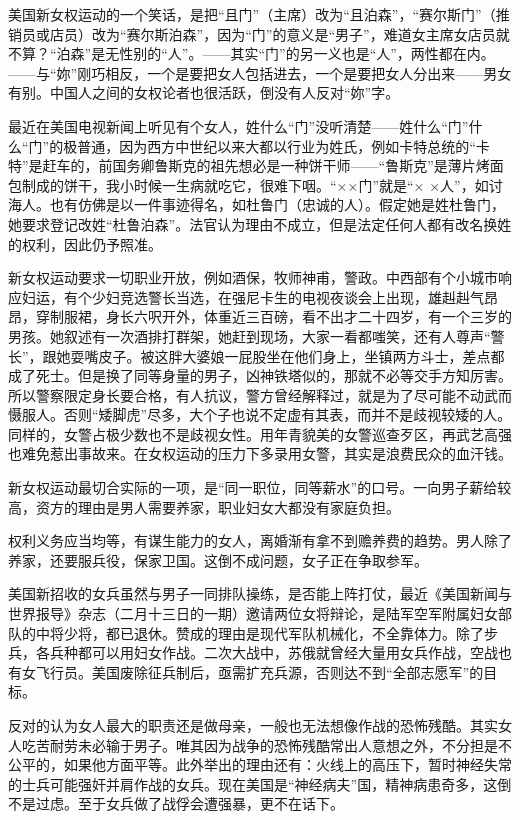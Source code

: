 \par 美国新女权运动的一个笑话，是把“且门”（主席）改为“且泊森”，“赛尔斯门”（推销员或店员）改为“赛尔斯泊森”，因为“门”的意义是“男子”，难道女主席女店员就不算？“泊森”是无性别的“人”。——其实“门”的另一义也是“人”，两性都在内。——与“妳”刚巧相反，一个是要把女人包括进去，一个是要把女人分出来——男女有别。中国人之间的女权论者也很活跃，倒没有人反对“妳”字。
\par 最近在美国电视新闻上听见有个女人，姓什么“门”没听清楚——姓什么“门”什么“门”的极普通，因为西方中世纪以来大都以行业为姓氏，例如卡特总统的“卡特”是赶车的，前国务卿鲁斯克的祖先想必是一种饼干师——“鲁斯克”是薄片烤面包制成的饼干，我小时候一生病就吃它，很难下咽。“××门”就是“× ×人”，如讨海人。也有仿佛是以一件事迹得名，如杜鲁门（忠诚的人）。假定她是姓杜鲁门，她要求登记改姓“杜鲁泊森”。法官认为理由不成立，但是法定任何人都有改名换姓的权利，因此仍予照准。
\par 新女权运动要求一切职业开放，例如酒保，牧师神甫，警政。中西部有个小城市响应妇运，有个少妇竞选警长当选，在强尼卡生的电视夜谈会上出现，雄赳赳气昂昂，穿制服裙，身长六呎开外，体重近三百磅，看不出才二十四岁，有一个三岁的男孩。她叙述有一次酒排打群架，她赶到现场，大家一看都嗤笑，还有人尊声“警长”，跟她耍嘴皮子。被这胖大婆娘一屁股坐在他们身上，坐镇两方斗士，差点都成了死士。但是换了同等身量的男子，凶神铁塔似的，那就不必等交手方知厉害。所以警察限定身长要合格，有人抗议，警方曾经解释过，就是为了尽可能不动武而慑服人。否则“矮脚虎”尽多，大个子也说不定虚有其表，而并不是歧视较矮的人。同样的，女警占极少数也不是歧视女性。用年青貌美的女警巡查歹区，再武艺高强也难免惹出事故来。在女权运动的压力下多录用女警，其实是浪费民众的血汗钱。
\par 新女权运动最切合实际的一项，是“同一职位，同等薪水”的口号。一向男子薪给较高，资方的理由是男人需要养家，职业妇女大都没有家庭负担。
\par 权利义务应当均等，有谋生能力的女人，离婚渐有拿不到赡养费的趋势。男人除了养家，还要服兵役，保家卫国。这倒不成问题，女子正在争取参军。
\par 美国新招收的女兵虽然与男子一同排队操练，是否能上阵打仗，最近《美国新闻与世界报导》杂志（二月十三日的一期）邀请两位女将辩论，是陆军空军附属妇女部队的中将少将，都已退休。赞成的理由是现代军队机械化，不全靠体力。除了步兵，各兵种都可以用妇女作战。二次大战中，苏俄就曾经大量用女兵作战，空战也有女飞行员。美国废除征兵制后，亟需扩充兵源，否则达不到“全部志愿军”的目标。
\par 反对的认为女人最大的职责还是做母亲，一般也无法想像作战的恐怖残酷。其实女人吃苦耐劳未必输于男子。唯其因为战争的恐怖残酷常出人意想之外，不分担是不公平的，如果他方面平等。此外举出的理由还有：火线上的高压下，暂时神经失常的士兵可能强奸并肩作战的女兵。现在美国是“神经病夫”国，精神病患奇多，这倒不是过虑。至于女兵做了战俘会遭强暴，更不在话下。
